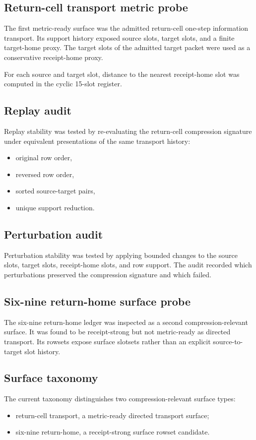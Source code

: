 \subsection{Return-cell transport metric probe}

The first metric-ready surface was the admitted return-cell one-step
information transport. Its support history exposed source slots, target slots,
and a finite target-home proxy. The target slots of the admitted target packet
were used as a conservative receipt-home proxy.

For each source and target slot, distance to the nearest receipt-home slot was
computed in the cyclic 15-slot register.

\subsection{Replay audit}

Replay stability was tested by re-evaluating the return-cell compression
signature under equivalent presentations of the same transport history:

\begin{itemize}
  \item original row order,
  \item reversed row order,
  \item sorted source-target pairs,
  \item unique support reduction.
\end{itemize}

\subsection{Perturbation audit}

Perturbation stability was tested by applying bounded changes to the source
slots, target slots, receipt-home slots, and row support. The audit recorded
which perturbations preserved the compression signature and which failed.

\subsection{Six-nine return-home surface probe}

The six-nine return-home ledger was inspected as a second compression-relevant
surface. It was found to be receipt-strong but not metric-ready as directed
transport. Its rowsets expose surface slotsets rather than an explicit
source-to-target slot history.

\subsection{Surface taxonomy}

The current taxonomy distinguishes two compression-relevant surface types:

\begin{itemize}
  \item return-cell transport, a metric-ready directed transport surface;
  \item six-nine return-home, a receipt-strong surface rowset candidate.
\end{itemize}
